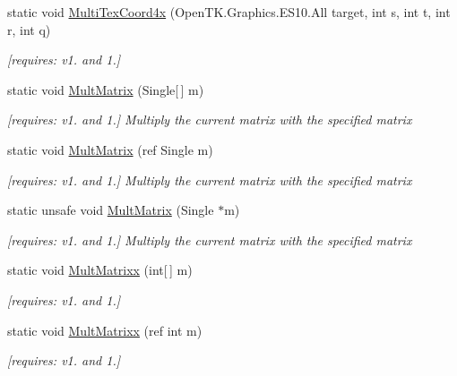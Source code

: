 \begin{DoxyCompactItemize}
static void \hyperlink{class_open_t_k_1_1_graphics_1_1_e_s10_1_1_g_l_a35e03b817db1fd28c555d1071fd54d67}{Multi\-Tex\-Coord4x} (Open\-T\-K.\-Graphics.\-E\-S10.\-All target, int s, int t, int r, int q)
\begin{DoxyCompactList}\small\item\em \mbox{[}requires\-: v1. and 1.\mbox{]}\end{DoxyCompactList}\item 
static void \hyperlink{class_open_t_k_1_1_graphics_1_1_e_s10_1_1_g_l_a6859b5de9f4b407ebd48f65bac00230e}{Mult\-Matrix} (Single\mbox{[}$\,$\mbox{]} m)
\begin{DoxyCompactList}\small\item\em \mbox{[}requires\-: v1. and 1.\mbox{]} Multiply the current matrix with the specified matrix \end{DoxyCompactList}\item 
static void \hyperlink{class_open_t_k_1_1_graphics_1_1_e_s10_1_1_g_l_ad0af3720e2c7b94740daefb869e3969e}{Mult\-Matrix} (ref Single m)
\begin{DoxyCompactList}\small\item\em \mbox{[}requires\-: v1. and 1.\mbox{]} Multiply the current matrix with the specified matrix \end{DoxyCompactList}\item 
static unsafe void \hyperlink{class_open_t_k_1_1_graphics_1_1_e_s10_1_1_g_l_ad6a960a34bb3a36a7677f4f6d3ffa633}{Mult\-Matrix} (Single $\ast$m)
\begin{DoxyCompactList}\small\item\em \mbox{[}requires\-: v1. and 1.\mbox{]} Multiply the current matrix with the specified matrix \end{DoxyCompactList}\item 
static void \hyperlink{class_open_t_k_1_1_graphics_1_1_e_s10_1_1_g_l_a2baf49fc850597d041a2bfbe128b5c34}{Mult\-Matrixx} (int\mbox{[}$\,$\mbox{]} m)
\begin{DoxyCompactList}\small\item\em \mbox{[}requires\-: v1. and 1.\mbox{]}\end{DoxyCompactList}\item 
static void \hyperlink{class_open_t_k_1_1_graphics_1_1_e_s10_1_1_g_l_a06e6e146fe3e60b4b084c6b9270171b2}{Mult\-Matrixx} (ref int m)
\begin{DoxyCompactList}\small\item\em \mbox{[}requires\-: v1. and 1.\mbox{]}\end{DoxyCompactList}\item 

\end{DoxyCompactItemize}
